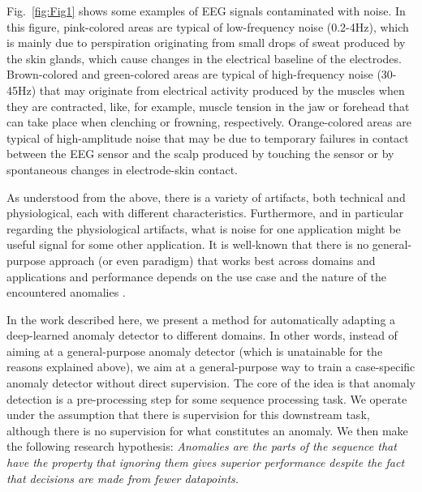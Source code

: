 \documentclass[runningheads]{llncs}
\newcommand{\deleted}[1]{\textbf{DEL:} #1}
\renewcommand{\deleted}[1]{}
\begin{document}
Fig.~\ref{fig:Fig1} shows some examples of EEG signals contaminated
with noise. In this figure, pink-colored areas are typical of
low-frequency noise (0.2-4Hz), which is mainly due to perspiration
originating from small drops of sweat produced by the skin glands,
which cause changes in the electrical baseline of the
electrodes. Brown-colored and green-colored areas are typical of
high-frequency noise (30-45Hz) that may originate from electrical
activity produced by the muscles when they are contracted, like, for
example, muscle tension in the jaw or forehead that can take place
when clenching or frowning, respectively. Orange-colored areas are
typical of high-amplitude noise that may be due to temporary failures
in contact between the EEG sensor and the scalp produced by touching
the sensor or by spontaneous changes in electrode-skin contact.

As understood from the above, there is a variety of artifacts, both
technical and physiological, each with different characteristics.
Furthermore, and in particular regarding the physiological artifacts,
what is noise for one application might be useful signal for some
other application. It is well-known that there is no general-purpose
approach (or even paradigm) that works best across domains and
applications and performance depends on the use case and the nature of
the encountered anomalies \cite{MEJRI2024124922}.

\deleted{As conventional approaches often struggle to provide satisfactory
results, or are limited by the need to tune their parameters for each
specific application on a case-by-case basis, recent advancements in
\emph{deep learning} have gained significant attention in the research
community \cite{MEJRI2024124922}. And, given the vagueness of what
constitutes ground truth, the most successful approaches are
unsupervised or self-supervised: \emph{forecasting-based} approaches
train a neural network to predict the next datapoint in the sequence
and \emph{reconstruction-based} approaches train a neural network to
reconstruct the sequence from a learned, compressed representation.
In either case, the assumption is that a high error between the
predicted/reconstructed sequence and the actual data is indicative of
an abnormality.}

In the work described here, we present a method for automatically
adapting a deep-learned anomaly detector to different domains. In
other words, instead of aiming at a general-purpose anomaly detector
(which is unatainable for the reasons explained above), we aim at a
general-purpose way to train a case-specific anomaly detector without
direct supervision.
The core of the idea is that anomaly detection is a pre-processing
step for some sequence processing task. We operate under the
assumption that there is supervision for this downstream task,
although there is no supervision for what constitutes an anomaly.
We then make the following research hypothesis:
\emph{Anomalies are the parts of the sequence that have the property
that ignoring them gives superior performance despite the fact that
decisions are made from fewer datapoints.}
\end{document}
